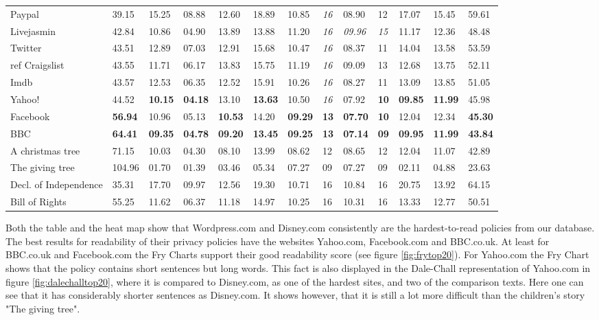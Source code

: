 \documentclass[runningheads,a4paper]{llncs}
\begin{document}
\begin{table}
\begin{tabular}{p{3.3cm}p{1.5cm}p{1.5cm}p{1.5cm}p{1.5cm}p{1.5cm}p{1.5cm}p{1.5cm}p{1.5cm}p{1.5cm}p{1.5cm}p{1.5cm}p{1.5cm}}
    Paypal & 39.15 & 15.25 & 08.88 & 12.60 & 18.89 & 10.85 & \textit{16} & 08.90 & 12    & 17.07 & 15.45 & 59.61 \\
    Livejasmin & 42.84 & 10.86 & 04.90 & 13.89 & 13.88 & 11.20 & \textit{16} & \textit{09.96} & \textit{15} & 11.17 & 12.36 & 48.48 \\
    Twitter & 43.51 & 12.89 & 07.03 & 12.91 & 15.68 & 10.47 & \textit{16} & 08.37 & 11    & 14.04 & 13.58 & 53.59 \\ref
    Craigslist & 43.55 & 11.71 & 06.17 & 13.83 & 15.75 & 11.19 & \textit{16} & 09.09 & 13    & 12.68 & 13.75 & 52.11 \\
    Imdb  & 43.57 & 12.53 & 06.35 & 12.52 & 15.91 & 10.26 & \textit{16} & 08.27 & 11    & 13.09 & 13.85 & 51.05 \\
    Yahoo! & 44.52 & \textbf{10.15} & \textbf{04.18} & 13.10 & \textbf{13.63} & 10.50 & \textit{16} & 07.92 & \textbf{10} & \textbf{09.85} & \textbf{11.99} & 45.98 \\
    Facebook & \textbf{56.94} & 10.96 & 05.13 & \textbf{10.53} & 14.20 & \textbf{09.29} & \textbf{13} & \textbf{07.70} & \textbf{10} & 12.04 & 12.34 & \textbf{45.30} \\
    BBC   & \textbf{64.41} & \textbf{09.35} & \textbf{04.78} & \textbf{09.20} & \textbf{13.45} & \textbf{09.25} & \textbf{13} & \textbf{07.14} & \textbf{09} & \textbf{09.95} & \textbf{11.99} & \textbf{43.84} \\
\midrule    
    A christmas tree & 71.15 & 10.03 & 04.30 & 08.10 & 13.99 & 08.62 & 12    & 08.65 & 12    & 12.04 & 11.07 & 42.89 \\
    The giving tree & 104.96 & 01.70 & 01.39 & 03.46 & 05.34 & 07.27 & 09    & 07.27 & 09    & 02.11 & 04.88 & 23.63 \\
    Decl. of Independence & 35.31 & 17.70 & 09.97 & 12.56 & 19.30 & 10.71 & 16    & 10.84 & 16    & 20.75 & 13.92 & 64.15 \\
    Bill of Rights & 55.25 & 11.62 & 06.37 & 11.18 & 14.97 & 10.25 & 16    & 10.31 & 16    & 13.33 & 12.77 & 50.51 \\
    \bottomrule
    \end{tabular}%
  \label{tab:allmeasures}%
\end{table}%

Both the table and the heat map show that Wordpress.com and Disney.com consistently are the hardest-to-read policies from our database. 
The best results for readability of their privacy policies have the websites Yahoo.com, Facebook.com and BBC.co.uk. At least for BBC.co.uk and Facebook.com the Fry Charts support their good readability score (see figure \ref{fig:frytop20}). For Yahoo.com the Fry Chart shows that the policy contains short sentences but long words. This fact is also displayed in the Dale-Chall representation of Yahoo.com in figure \ref{fig:dalechalltop20}, where it is compared to Disney.com, as one of the hardest sites, and two of the comparison texts. Here one can see that it has considerably shorter sentences as Disney.com. It shows however, that it is still a lot more difficult than the children's story "The giving tree".
\end{document}
